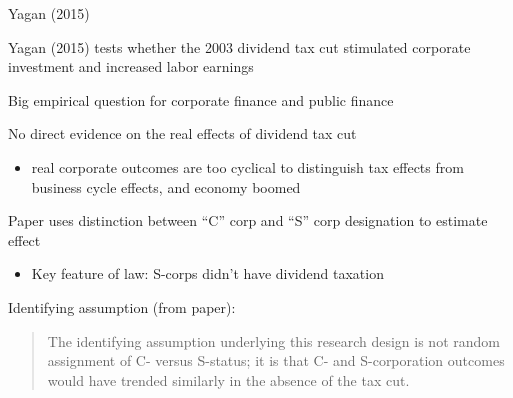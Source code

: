 \documentclass[notes,11pt, aspectratio=169]{beamer}
\newenvironment{wideitemize}{\itemize\addtolength{\itemsep}{10pt}}{\enditemize}
\begin{document}
\begin{frame}{Yagan (2015)}
  \begin{wideitemize}
  \item Yagan (2015) tests whether the 2003 dividend tax cut
    stimulated corporate investment and increased labor earnings
  \item Big empirical question for corporate  finance and public finance
  \item No direct evidence on the real effects of dividend tax cut
    \begin{itemize}
    \item real corporate outcomes are too cyclical to distinguish tax
      effects from business cycle effects, and economy boomed
    \end{itemize}
  \item Paper uses distinction between ``C'' corp and ``S'' corp designation to estimate effect
    \begin{itemize}
    \item Key feature of law: S-corps didn't have dividend taxation
    \end{itemize}
  \item Identifying assumption (from paper):
    \begin{quote}
      The identifying assumption underlying this research design is
      not random assignment of C- versus S-status; it is that C- and
      S-corporation outcomes would have trended similarly in the
      absence of the tax cut.
    \end{quote}
  \end{wideitemize}
\end{frame}
\end{document}
